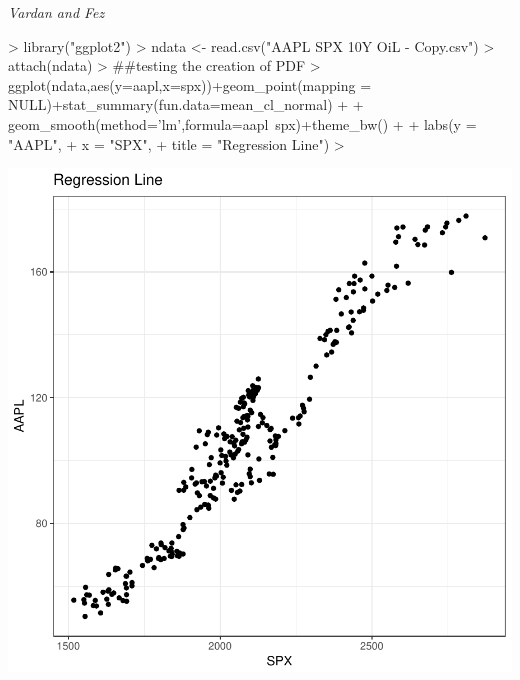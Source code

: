 \documentclass{article}
\begin{document}


\emph{Vardan and Fez}


\begin{Schunk}
\begin{Sinput}
> library("ggplot2")
> ndata <- read.csv("AAPL SPX 10Y OiL - Copy.csv")
> attach(ndata)
> ##testing the creation of PDF
> ggplot(ndata,aes(y=aapl,x=spx))+geom_point(mapping = NULL)+stat_summary(fun.data=mean_cl_normal) + 
+   geom_smooth(method='lm',formula=aapl~spx)+theme_bw() +
+   labs(y = "AAPL",
+        x = "SPX",
+        title = "Regression Line")
> 
\end{Sinput}
\end{Schunk}
\includegraphics{regressionpdf-001}
\end{document}
